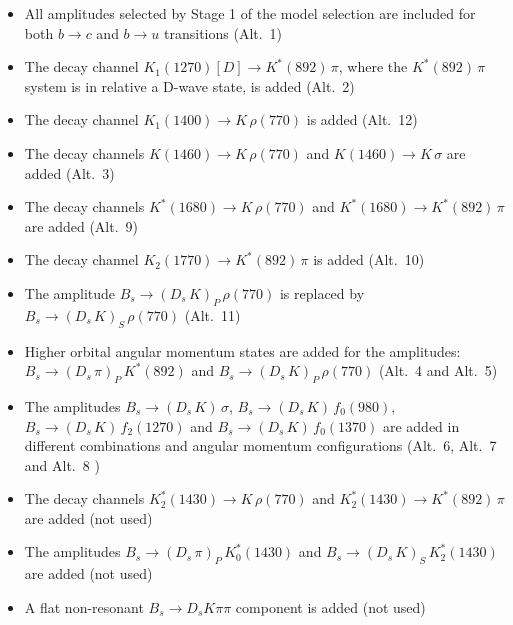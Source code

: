 \begin{itemize}
\small
	\item All amplitudes selected by Stage 1 of the model selection are included for both $b\to c$ and $b\to u$ transitions (Alt.~1)
				
	\item The decay channel $K_1(1270)[D] \to K^*(892) \, \pi$, where the $K^*(892) \, \pi$ system is in relative a D-wave state, is added (Alt.~2)

	\item The decay channel $K_1(1400) \to K \, \rho(770)$ is added (Alt.~12)
		
	\item The decay channels $K(1460) \to K \, \rho(770)$ and $K(1460) \to K \, \sigma$ are added (Alt.~3)
	
	
	\item The decay channels $K^*(1680) \to K \, \rho(770)$ and $K^*(1680) \to K^*(892) \, \pi$ are added (Alt.~9)
	
	\item The decay channel $K_2(1770)  \to K^*(892) \, \pi$ is added (Alt.~10)
		
	\item The amplitude $B_s \to (D_s \, K)_{P} \, \rho(770)$ is replaced by $B_s \to (D_s \, K)_{S} \, \rho(770)$  (Alt.~11)
	
	\item Higher orbital angular momentum states are added for the amplitudes: $B_s \to (D_s \, \pi)_{P} \, K^{*}(892)$ and $B_s \to (D_s \, K)_{P} \, \rho(770)$  (Alt.~4 and Alt.~5)
	

	\item The amplitudes $B_s \to (D_s \, K) \, \sigma$, $B_s \to (D_s \, K) \, f_0(980)$, $B_s \to (D_s \, K) \, f_2(1270)$ and $B_s \to (D_s \, K) \, f_0(1370)$ are added in different combinations and angular momentum configurations (Alt.~6, Alt.~7 and Alt.~8 )

	\item The decay channels $K_2^*(1430) \to K \, \rho(770)$ and $K_2^*(1430) \to K^*(892) \, \pi$ are added (not used)

	\item The amplitudes $B_s \to (D_s \, \pi)_{P} \, K_0^*(1430)$ and $B_s \to (D_s \, K)_{S} \, K_2^*(1430)$ are added (not used)

	\item A flat non-resonant $B_s \to D_s K \pi\pi$ component is added (not used)

\end{itemize}

